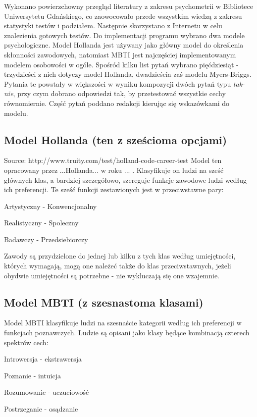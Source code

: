 \documentclass[12pt,a4paper,oneside]{report} %
\begin{document}
Wykonano powierzchowny przegląd literatury z zakresu psychometrii w Bibliotece Uniwersytetu Gdańskiego, co zaowocowało przede wszystkim wiedzą z zakresu statystyki testów i podziałem. Następnie skorzystano z Internetu w celu znalezienia gotowych testów. Do implementacji programu wybrano dwa modele psychologiczne. Model Hollanda jest używany jako główny model do określenia skłonności zawodowych, natomiast MBTI jest najczęściej implementowanym modelem osobowości w ogóle. Spośród kilku list pytań wybrano pięćdziesiąt - trzydzieści z nich dotyczy model Hollanda, dwadzieścia zaś modelu Myers-Briggs. Pytania te powstały w większości w wyniku kompozycji dwóch pytań typu \emph{tak-nie}, przy czym dobrano odpowiedzi tak, by przetestować wszystkie cechy równomiernie. Część pytań poddano redakcji kierując się wskazówkami do modelu.

\subsection{Model Hollanda (ten z sześcioma opcjami)}

Source: http://www.truity.com/test/holland-code-career-test
Model ten opracowany przez ...Hollanda... w roku ... . Klasyfikuje on ludzi na sześć głównych klas, a bardziej szczegółowo, szereguje funkcje zawodowe ludzi według ich preferencji. Te sześć funkcji zestawionych jest w przeciwstawne pary:\par
Artystyczny - Konwencjonalny\par
Realistyczny - Spoleczny\par
Badawczy - Przedsiebiorczy\par
Zawody są przydzielone do jednej lub kilku z tych klas według umiejętności, których wymagają, mogą one należeć także do klas przeciwstawnych, jeżeli obydwie umiejętności są potrzebne - nie wykluczają się one wzajemnie.\par

\subsection{Model MBTI (z szesnastoma klasami)}

Model MBTI klasyfikuje ludzi na szesnaście kategorii według ich preferencji w funkcjach poznawczych. Ludzie są opisani jako klasy będące kombinacją czterech spektrów cech:\par
Introwersja - ekstrawersja\par
Poznanie - intuicja\par
Rozumowanie - uczuciowość\par
Postrzeganie - osądzanie\par
\end{document}
